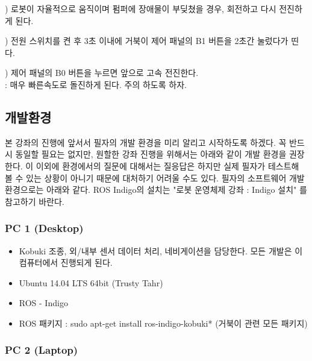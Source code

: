 \vspace{\baselineskip}
\noindent{}
\thenum) 로봇이 자율적으로 움직이며 펌퍼에 장애물이 부딪쳤을 경우, 회전하고 다시 전진하게 된다.

\vspace{\baselineskip}
\noindent{}
\thenum)  전원 스위치를 켠 후 3초 이내에 거북이 제어 패널의 B1 버튼을 2초간 눌렀다가 띤다.

\vspace{\baselineskip}
\noindent{}
\thenum)  제어 패널의 B0 버튼을 누르면 앞으로 고속 전진한다.\\
: 매우 빠른속도로 돌진하게 된다. 주의 하도록 하자.

\subsection{개발환경}

본 강좌의 진행에 앞서서 필자의 개발 환경을 미리 알리고 시작하도록 하겠다. 꼭 반드시 동일할 필요는 없지만, 원할한 강좌 진행을 위해서는 아래와 같이 개발 환경을 권장한다. 이 이외에 환경에서의 질문에 대해서는 질응답은 하지만 실제 필자가 테스트해 볼 수 있는 상황이 아니기 때문에 대처하기 어려울 수도 있다. 필자의 소프트웨어 개발환경으로는 아래와 같다. ROS Indigo의 설치는 "로봇 운영체제 강좌 : Indigo 설치" 를 참고하기 바란다.

\subsubsection{PC 1 (Desktop)}

\begin{itemize}[leftmargin=*]
\item Kobuki 조종, 외/내부 센서 데이터 처리, 네비게이션을 담당한다. 모든 개발은 이 컴퓨터에서 진행되게 된다.
\item Ubuntu 14.04 LTS 64bit (Trusty Tahr)
\item ROS - Indigo
\item ROS 패키지 : sudo apt-get install ros-indigo-kobuki* (거북이 관련 모든 패키지)
\end{itemize}

\subsubsection{PC 2 (Laptop)}

